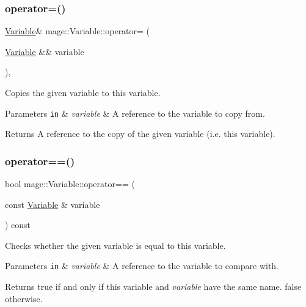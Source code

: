 \subsubsection{\texorpdfstring{operator=()}{operator=()}\hspace{0.1cm}{\footnotesize\ttfamily [2/2]}}
{\footnotesize\ttfamily \hyperlink{structmage_1_1_variable}{Variable}\& mage\+::\+Variable\+::operator= (\begin{DoxyParamCaption}\item[{\hyperlink{structmage_1_1_variable}{Variable} \&\&}]{variable }\end{DoxyParamCaption})\hspace{0.3cm}{\ttfamily [private]}, {\ttfamily [delete]}}

Copies the given variable to this variable.


\begin{DoxyParams}[1]{Parameters}
\mbox{\tt in}  & {\em variable} & A reference to the variable to copy from. \\
\hline
\end{DoxyParams}
\begin{DoxyReturn}{Returns}
A reference to the copy of the given variable (i.\+e. this variable). 
\end{DoxyReturn}
\hypertarget{structmage_1_1_variable_a5d1f7965ca7d0e29f6879cda014e8fa9}{}\label{structmage_1_1_variable_a5d1f7965ca7d0e29f6879cda014e8fa9} 
\subsubsection{\texorpdfstring{operator==()}{operator==()}}
{\footnotesize\ttfamily bool mage\+::\+Variable\+::operator== (\begin{DoxyParamCaption}\item[{const \hyperlink{structmage_1_1_variable}{Variable} \&}]{variable }\end{DoxyParamCaption}) const}

Checks whether the given variable is equal to this variable.


\begin{DoxyParams}[1]{Parameters}
\mbox{\tt in}  & {\em variable} & A reference to the variable to compare with. \\
\hline
\end{DoxyParams}
\begin{DoxyReturn}{Returns}
{\ttfamily true} if and only if this variable and {\itshape variable} have the same name. {\ttfamily false} otherwise. 
\end{DoxyReturn}
\hypertarget{structmage_1_1_variable_afa9cfd0a42d8a15cccf7f49197648504}{}\label{structmage_1_1_variable_afa9cfd0a42d8a15cccf7f49197648504} 
